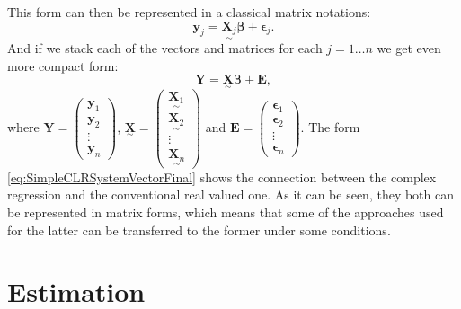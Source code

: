 \documentclass[
]{book}
\begin{document}
This form can then be represented in a classical matrix notations:
\begin{equation}
    \mathbf{y}_j = \underset{\sim}{\mathbf{X}_j} {\boldsymbol{\beta}} + \boldsymbol{\epsilon}_j .
    \label{eq:SimpleCLRSystemVector03}
\end{equation}
And if we stack each of the vectors and matrices for each \(j=1 \dots n\) we get even more compact form:
\begin{equation}
    \mathbf{Y} = \underset{\sim}{\mathbf{X}} \boldsymbol{\beta} + \mathbf{E} ,
    \label{eq:SimpleCLRSystemVectorFinal}
\end{equation}
where \(\mathbf{Y}=\begin{pmatrix}\mathbf{y}_1 \\ \mathbf{y}_2\\ \vdots \\ \mathbf{y}_n \end{pmatrix}\), \(\underset{\sim}{\mathbf{X}}=\begin{pmatrix} \underset{\sim}{\mathbf{X}_1} \\ \underset{\sim}{\mathbf{X}_2} \\ \vdots \\ \underset{\sim}{\mathbf{X}_n} \end{pmatrix}\) and \(\mathbf{E}=\begin{pmatrix}\boldsymbol{\epsilon}_1 \\ \boldsymbol{\epsilon}_2\\ \vdots \\ \boldsymbol{\epsilon}_n \end{pmatrix}\). The form \eqref{eq:SimpleCLRSystemVectorFinal} shows the connection between the complex regression and the conventional real valued one. As it can be seen, they both can be represented in matrix forms, which means that some of the approaches used for the latter can be transferred to the former under some conditions.

\hypertarget{SCLREstimation}{%
\section{Estimation}\label{SCLREstimation}}
\end{document}
